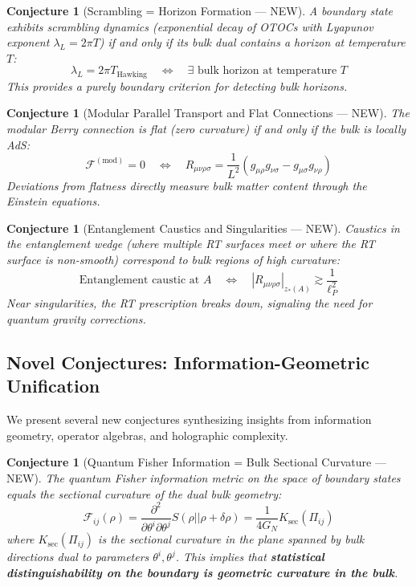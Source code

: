 \documentclass[12pt,a4paper]{article}
\newtheorem{conjecture}[theorem]{Conjecture}
\begin{document}
\begin{conjecture}[Scrambling = Horizon Formation --- NEW]
A boundary state exhibits scrambling dynamics (exponential decay of OTOCs with Lyapunov exponent $\lambda_L = 2\pi T$) if and only if its bulk dual contains a horizon at temperature $T$:
\begin{equation}
\lambda_L = 2\pi T_{\text{Hawking}} \quad \Leftrightarrow \quad \exists \text{ bulk horizon at temperature } T
\end{equation}
This provides a purely boundary criterion for detecting bulk horizons.
\end{conjecture}

\begin{conjecture}[Modular Parallel Transport and Flat Connections --- NEW]
The modular Berry connection is flat (zero curvature) if and only if the bulk is locally AdS:
\begin{equation}
\mathcal{F}^{(\text{mod})} = 0 \quad \Leftrightarrow \quad R_{\mu\nu\rho\sigma} = \frac{1}{L^2}(g_{\mu\rho}g_{\nu\sigma} - g_{\mu\sigma}g_{\nu\rho})
\end{equation}
Deviations from flatness directly measure bulk matter content through the Einstein equations.
\end{conjecture}

\begin{conjecture}[Entanglement Caustics and Singularities --- NEW]
Caustics in the entanglement wedge (where multiple RT surfaces meet or where the RT surface is non-smooth) correspond to bulk regions of high curvature:
\begin{equation}
\text{Entanglement caustic at } A \quad \Leftrightarrow \quad |R_{\mu\nu\rho\sigma}|_{z_*(A)} \gtrsim \frac{1}{\ell_P^2}
\end{equation}
Near singularities, the RT prescription breaks down, signaling the need for quantum gravity corrections.
\end{conjecture}

\subsection{Novel Conjectures: Information-Geometric Unification}

We present several new conjectures synthesizing insights from information geometry, operator algebras, and holographic complexity.

\begin{conjecture}[Quantum Fisher Information = Bulk Sectional Curvature --- NEW]
The quantum Fisher information metric on the space of boundary states equals the sectional curvature of the dual bulk geometry:
\begin{equation}
\mathcal{F}_{ij}(\rho) = \frac{\partial^2}{\partial \theta^i \partial \theta^j} S(\rho || \rho + \delta\rho) = \frac{1}{4G_N} K_{\text{sec}}(\Pi_{ij})
\end{equation}
where $K_{\text{sec}}(\Pi_{ij})$ is the sectional curvature in the plane spanned by bulk directions dual to parameters $\theta^i, \theta^j$. This implies that \textbf{statistical distinguishability on the boundary is geometric curvature in the bulk}.
\end{conjecture}
\end{document}
